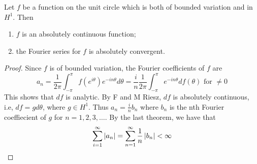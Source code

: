 \begin{theorem}
    Let $f$ be a function on the unit circle which is both of bounded variation and in $H^{1}$. Then 
    \begin{enumerate}[label=(\roman*)]
	\item $f$ is an absolutely continuous function;
	\item the Fourier series for $f$ is absolutely convergent.
    \end{enumerate}
    \label{thm:bdd-var-h1}
    
\end{theorem}
    \begin{proof}
	Since $f$ is of bounded variation, the Fourier coefficients of $f$ are 
	\begin{equation*}
	    a_{n} = \frac{1}{2\pi} \int_{-\pi}^{\pi} f\left( e^{i\theta} \right) e^{-in\theta} d\theta = \frac{i}{n} \frac{1}{2\pi} \int_{-\pi}^{\pi} e^{-in\theta} df\left( \theta \right) \text{ for } \ne 0
	\end{equation*}
    This shows that $df$ is analytic. By F and M Riesz, $df$ is absolutely continuous, i.e, $df= g d\theta$, where $g \in H^{1}$. Thus $a_{n} = \frac{i}{n}b_{n}$ where $b_{n}$ is the nth Fourier coeffiecient of $g$ for $n=1,2,3, \ldots$. By the last theorem, we have that
    \begin{equation*}
	\sum_{i=1}^{\infty} \left\lvert a_{n} \right\rvert = \sum_{n=1}^{\infty} \frac{1}{n} \left\lvert b_{n} \right\rvert < \infty
    \end{equation*}
    \end{proof}

